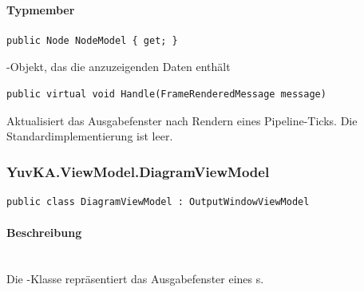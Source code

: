 \paragraph{Typmember}
\begin{itemize}

	\begin{verbatim}
public Node NodeModel { get; }
	\end{verbatim}
	-Objekt, das die anzuzeigenden Daten enthält	

	\begin{verbatim}
public virtual void Handle(FrameRenderedMessage message)
	\end{verbatim}
	Aktualisiert das Ausgabefenster nach Rendern eines Pipeline-Ticks. Die Standardimplementierung ist leer.

\end{itemize}

\subsubsection{YuvKA.ViewModel.DiagramViewModel}

\begin{verbatim}
public class DiagramViewModel : OutputWindowViewModel
\end{verbatim}

\paragraph{Beschreibung}~\\
Die -Klasse repräsentiert das Ausgabefenster eines s.

